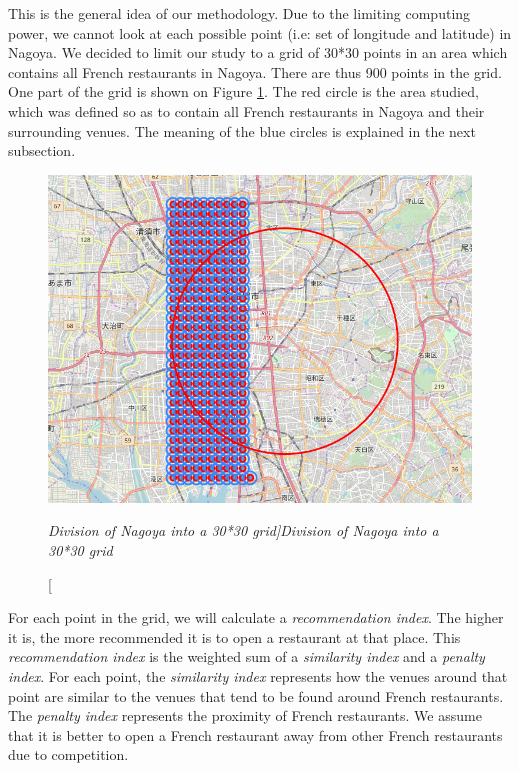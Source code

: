 \documentclass[12pt,a4paper]{article}
\begin{document}
\medskip

This is the general idea of our methodology. Due to the limiting computing power, we cannot look at each possible point (i.e: set of longitude and latitude) in Nagoya. We decided to limit our study to a grid of 30*30 points in an area which contains all French restaurants in Nagoya. There are thus 900 points in the grid. One part of the grid is shown on Figure \ref{nagoya_grid}. The red circle is the area studied, which was defined so as to contain all French restaurants in Nagoya and their surrounding venues. The meaning of the blue circles is explained in the next subsection. 

\begin{figure}[ht]
	\begin{center}
			  \includegraphics[width=15cm]{nagoya_grid.png}
	\end{center}
	\caption [\itshape Division of Nagoya into a 30*30 grid]{\itshape Division of Nagoya into a 30*30 grid}	
	\label{nagoya_grid}
\end{figure}

\medskip

For each point in the grid, we will calculate a \textit{recommendation index}. The higher it is, the more recommended it is to open a restaurant at that place. This \textit{recommendation index} is the weighted sum of a \textit{similarity index} and a \textit{penalty index}. For each point, the \textit{similarity index} represents how the venues around that point are similar to the venues that tend to be found around French restaurants. The \textit{penalty index} represents the proximity of French restaurants. We assume that it is better to open a French restaurant away from other French restaurants due to competition.
\end{document}
